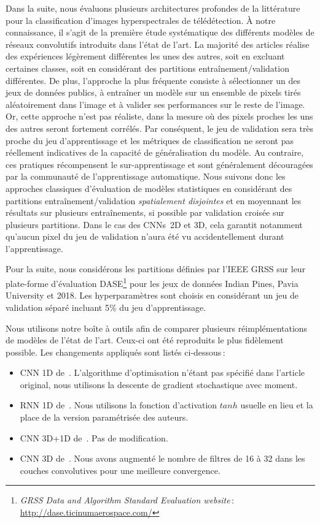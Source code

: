 Dans la suite, nous évaluons plusieurs architectures profondes de la littérature pour la classification d'images hyperspectrales de télédétection. À notre connaissance, il s'agit de la première étude systématique des différents modèles de réseaux convolutifs introduits dans l'état de l'art. La majorité des articles réalise des expériences légèrement différentes les unes des autres, soit en excluant certaines classes, soit en considérant des partitions entraînement/validation différentes. De plus, l'approche la plus fréquente consiste à sélectionner un des jeux de données publics, à entraîner un modèle sur un ensemble de pixels tirés aléatoirement dans l'image et à valider ses performances sur le reste de l'image. Or, cette approche n'est pas réaliste, dans la mesure où des pixels proches les uns des autres seront fortement corrélés. Par conséquent, le jeu de validation sera très proche du jeu d'apprentissage et les métriques de classification ne seront pas réellement indicatives de la capacité de généralisation du modèle. Au contraire, ces pratiques récompensent le sur-apprentissage et sont généralement découragées par la communauté de l'apprentissage automatique. Nous suivons donc les approches classiques d'évaluation de modèles statistiques en considérant des partitions entraînement/validation \emph{spatialement disjointes} et en moyennant les résultats sur plusieurs entraînements, si possible par validation croisée sur plusieurs partitions. Dans le cas des \glspl{CNN}~2D et 3D, cela garantit notamment qu'aucun pixel du jeu de validation n'aura été vu accidentellement durant l'apprentissage.

Pour la suite, nous considérons les partitions définies par l'\gls{IEEE} \gls{GRSS} sur leur plate-forme d'évaluation DASE\footnote{\emph{GRSS Data and Algorithm Standard Evaluation website}\,: \url{http://dase.ticinumaerospace.com/}} pour les jeux de données Indian Pines, Pavia University et  2018. Les hyperparamètres sont choisis en considérant un jeu de validation séparé incluant 5\% du jeu d'apprentissage.

Nous utilisons notre boîte à outils afin de comparer plusieurs réimplémentations de modèles de l'état de l'art. Ceux-ci ont été reproduits le plus fidèlement possible. Les changements appliqués sont listés ci-dessous\,:
\begin{itemize}
	\item \gls{CNN} 1D de~\citet{hu_deep_2015}. L'algorithme d'optimisation n'étant pas spécifié dans l'article original, nous utilisons la descente de gradient stochastique avec moment.
    \item \gls{RNN} 1D de~\citet{mou_deep_2017}. Nous utilisons la fonction d'activation $tanh$ usuelle en lieu et la place de la version paramétrisée des auteurs.
    \item \gls{CNN} 3D+1D de~\citet{ben_hamida_deep_2016}. Pas de modification.
    \item \gls{CNN} 3D de~\citet{li_spectralspatial_2017}. Nous avons augmenté le nombre de filtres de 16 à 32 dans les couches convolutives pour une meilleure convergence.
\end{itemize}

